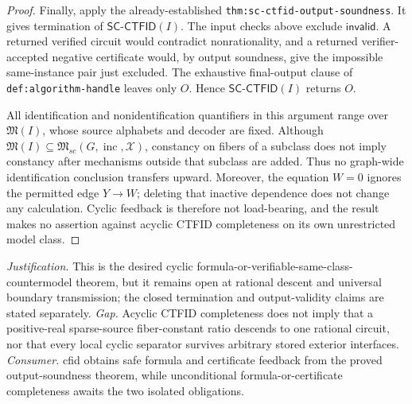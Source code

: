 \documentclass{article}
\begin{document}
\begin{proof}
Finally, apply the already-established \texttt{thm:sc-ctfid-output-soundness}.  It gives termination of \(\mathsf{SC\mbox{-}CTFID}(I)\).  The input checks above exclude \(\mathsf{invalid}\).  A returned verified circuit would contradict nonrationality, and a returned verifier-accepted negative certificate would, by output soundness, give the impossible same-instance pair just excluded.  The exhaustive final-output clause of \texttt{def:algorithm-handle} leaves only \(O\).  Hence \(\mathsf{SC\mbox{-}CTFID}(I)\) returns \(O\).

All identification and nonidentification quantifiers in this argument range over \(\mathfrak M(I)\), whose source alphabets and decoder are fixed.  Although \(\mathfrak M(I)\subseteq\mathfrak M_{sc}(G,\operatorname{inc},\mathcal X)\), constancy on fibers of a subclass does not imply constancy after mechanisms outside that subclass are added.  Thus no graph-wide identification conclusion transfers upward.  Moreover, the equation \(W=0\) ignores the permitted edge \(Y\to W\); deleting that inactive dependence does not change any calculation.  Cyclic feedback is therefore not load-bearing, and the result makes no assertion against acyclic CTFID completeness on its own unrestricted model class.
\end{proof}
\par\smallskip\noindent \textit{Justification.} This is the desired cyclic formula-or-verifiable-same-class-countermodel theorem, but it remains open at rational descent and universal boundary transmission; the closed termination and output-validity claims are stated separately. \textit{Gap.} Acyclic CTFID completeness does not imply that a positive-real sparse-source fiber-constant ratio descends to one rational circuit, nor that every local cyclic separator survives arbitrary stored exterior interfaces. \textit{Consumer.} cfid obtains safe formula and certificate feedback from the proved output-soundness theorem, while unconditional formula-or-certificate completeness awaits the two isolated obligations.
\end{document}
